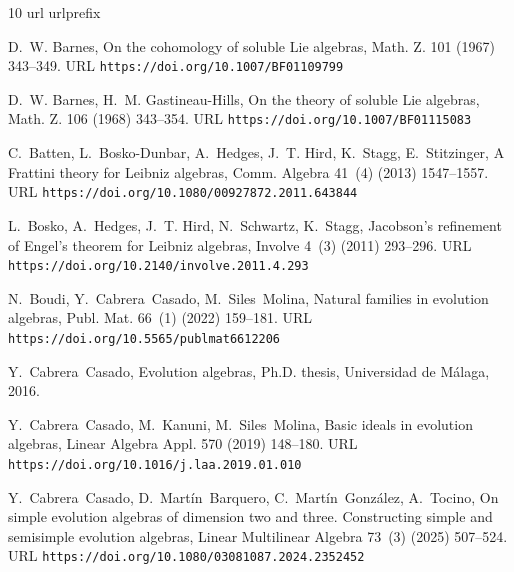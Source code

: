 \documentclass[12pt,reqno]{amsart}
\theoremstyle{definition}
\theoremstyle{remark}
\numberwithin{equation}{section}
\begin{document}
%
%

\begin{thebibliography}{10}
\expandafter\ifx\csname url\endcsname\relax
  \def\url#1{\texttt{#1}}\fi
\expandafter\ifx\csname urlprefix\endcsname\relax\def\urlprefix{URL }\fi

D.~W. Barnes, On the cohomology of soluble {L}ie algebras, Math. Z. 101 (1967)
  343--349.
\newline\urlprefix\url{https://doi.org/10.1007/BF01109799}

D.~W. Barnes, H.~M. Gastineau-Hills, On the theory of soluble {L}ie algebras,
  Math. Z. 106 (1968) 343--354.
\newline\urlprefix\url{https://doi.org/10.1007/BF01115083}

C.~Batten, L.~Bosko-Dunbar, A.~Hedges, J.~T. Hird, K.~Stagg, E.~Stitzinger, A
  {F}rattini theory for {L}eibniz algebras, Comm. Algebra 41~(4) (2013)
  1547--1557.
\newline\urlprefix\url{https://doi.org/10.1080/00927872.2011.643844}

L.~Bosko, A.~Hedges, J.~T. Hird, N.~Schwartz, K.~Stagg, Jacobson's refinement
  of {E}ngel's theorem for {L}eibniz algebras, Involve 4~(3) (2011) 293--296.
\newline\urlprefix\url{https://doi.org/10.2140/involve.2011.4.293}

N.~Boudi, Y.~Cabrera~Casado, M.~Siles~Molina, Natural families in evolution
  algebras, Publ. Mat. 66~(1) (2022) 159--181.
\newline\urlprefix\url{https://doi.org/10.5565/publmat6612206}

Y.~Cabrera~Casado, Evolution algebras, Ph.D. thesis, Universidad de Málaga, 2016.

Y.~Cabrera~Casado, M.~Kanuni, M.~Siles~Molina, Basic ideals in evolution
  algebras, Linear Algebra Appl. 570 (2019) 148--180.
\newline\urlprefix\url{https://doi.org/10.1016/j.laa.2019.01.010}

Y.~Cabrera~Casado, D.~Mart\'in~Barquero, C.~Mart\'in~Gonz\'alez, A.~Tocino, On
  simple evolution algebras of dimension two and three. {C}onstructing simple
  and semisimple evolution algebras, Linear Multilinear Algebra 73~(3) (2025)
  507--524.
\newline\urlprefix\url{https://doi.org/10.1080/03081087.2024.2352452}


\end{thebibliography}
\end{document}
